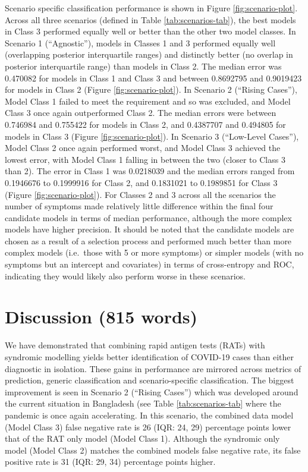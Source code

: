 \documentclass[]{elsarticle} %
\begin{document}
Scenario specific classification performance is shown in Figure \ref{fig:scenario-plot}.
Across all three scenarios (defined in Table \ref{tab:scenarios-tab}), the best models in Class 3 performed equally well or better than the other two model classes.
In Scenario 1 (``Agnostic''), models in Classes 1 and 3 performed equally well (overlapping posterior interquartile ranges) and distinctly better (no overlap in posterior interquartile range) than models in Class 2.
The median error was 0.470082 for models in Class 1 and Class 3 and between 0.8692795 and 0.9019423 for models in Class 2 (Figure \ref{fig:scenario-plot}).
In Scenario 2 (``Rising Cases''), Model Class 1 failed to meet the requirement and so was excluded, and Model Class 3 once again outperformed Class 2.
The median errors were between 0.746984 and 0.755422 for models in Class 2, and 0.4387707 and 0.494805 for models in Class 3 (Figure \ref{fig:scenario-plot}).
In Scenario 3 (``Low-Level Cases''), Model Class 2 once again performed worst, and Model Class 3 achieved the lowest error, with Model Class 1 falling in between the two (closer to Class 3 than 2).
The error in Class 1 was 0.0218039 and the median errors ranged from 0.1946676 to 0.1999916 for Class 2, and 0.1831021 to 0.1989851 for Class 3 (Figure \ref{fig:scenario-plot}).
For Classes 2 and 3 across all the scenarios the number of symptoms made relatively little difference within the final four candidate models in terms of median performance, although the more complex models have higher precision.
It should be noted that the candidate models are chosen as a result of a selection process and performed much better than more complex models (i.e.~those with 5 or more symptoms) or simpler models (with no symptoms but an intercept and covariates) in terms of cross-entropy and ROC, indicating they would likely also perform worse in these scenarios.

\hypertarget{discussion-815-words}{%
\section{Discussion (815 words)}\label{discussion-815-words}}

We have demonstrated that combining rapid antigen tests (RATs) with syndromic modelling yields better identification of COVID-19 cases than either diagnostic in isolation.
These gains in performance are mirrored across metrics of prediction, generic classification and scenario-specific classification.
The biggest improvement is seen in Scenario 2 (``Rising Cases'') which was developed around the current situation in Bangladesh (see Table \ref{tab:scenarios-tab} where the pandemic is once again accelerating.
In this scenario, the combined data model (Model Class 3) false negative rate is 26 (IQR: 24, 29) percentage points lower that of the RAT only model (Model Class 1).
Although the syndromic only model (Model Class 2) matches the combined models false negative rate, its false positive rate is
31 (IQR: 29, 34) percentage points higher.
\end{document}
